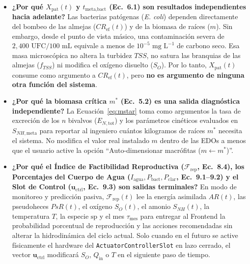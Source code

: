 \documentclass[11pt,letterpaper]{article}
\begin{document}
\begin{itemize}[leftmargin=1.5em]
    \item \textbf{¿Por qué $X_{\text{pat}}(t)$ y $t_{\text{meta,bact}}$ (Ec.\ 6.1) son resultados independientes hacia adelante?}
    Las bacterias patógenas (\textit{E. coli}) dependen directamente del bombeo de las almejas ($CR_{\text{ef}}(t)$) y de la biomasa de raíces ($m$). Sin embargo, desde el punto de vista másico, una contaminación severa de $2,400\text{ UFC}/100\text{ mL}$ equivale a menos de $10^{-5}\text{ mg L}^{-1}$ de carbono seco. Esa masa microscópica no altera la turbidez $TSS$, no satura las branquias de las almejas ($f_{TSS}$) ni modifica el oxígeno disuelto ($S_O$). Por lo tanto, $X_{\text{pat}}(t)$ consume como argumento a $CR_{\text{ef}}(t)$, pero \textbf{no es argumento de ninguna otra función del sistema}.
    \item \textbf{¿Por qué la biomasa crítica $m^*$ (Ec.\ 5.2) es una salida diagnóstica independiente?}
    La Ecuación~\eqref{eq:mstar} toma como argumentos la tasa de excreción de los $n$ bivalvos ($E_{N,\text{tot}}$) y los parámetros cinéticos evaluados en $S_{NH,\text{meta}}$ para reportar al ingeniero cuántos kilogramos de raíces $m^*$ necesita el sistema. No modifica el valor real instalado $m$ dentro de las EDOs a menos que el usuario active la opción ``Auto-dimensionar macrófitas ($m \leftarrow m^*$)''.
    \item \textbf{¿Por qué el Índice de Factibilidad Reproductiva ($\mathcal{F}_{\text{rep}}$, Ec.\ 8.4), los Porcentajes del Cuerpo de Agua ($I_{\text{agua}}, P_{\text{bact}}, P_{\text{clar}}$, Ec.\ 9.1--9.2) y el Slot de Control ($\mathbf{u}_{\text{ctrl}}$, Ec.\ 9.3) son salidas terminales?}
    En modo de monitoreo y predicción pasiva, $\mathcal{F}_{\text{rep}}(t)$ lee la energía asimilada $AR(t)$, las pseudoheces $PsR(t)$, el oxígeno $S_O(t)$, el amonio $S_{NH}(t)$, la temperatura $T$, la especie $\text{sp}$ y el mes $\tau_{\text{mes}}$ para entregar al Frontend la probabilidad porcentual de reproducción y las acciones recomendadas sin alterar la hidrodinámica del ciclo actual. Solo cuando en el futuro se active físicamente el hardware del \texttt{ActuatorControllerSlot} en lazo cerrado, el vector $\mathbf{u}_{\text{ctrl}}$ modificará $S_O$, $Q_{\text{in}}$ o $T$ en el siguiente paso de tiempo.
\end{itemize}

\newpage
\end{document}

